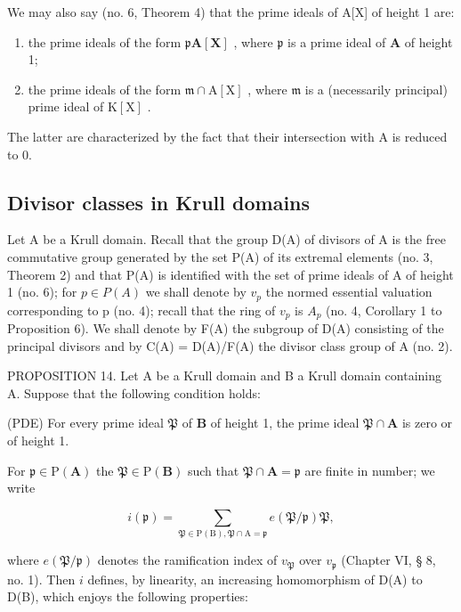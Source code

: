 We may also say (no. 6, Theorem 4) that the prime ideals of A{[}X{]} of height 1 are:

\begin{enumerate}
\def\labelenumi{(\arabic{enumi})}
\item
  the prime ideals of the form \(\mathfrak{p}\mathbf{A}[\mathbf{X}]\) , where \(\mathfrak{p}\) is a prime ideal of \(\mathbf{A}\) of height 1;
\item
  the prime ideals of the form \(\mathfrak{m} \cap \mathrm{A}[\mathrm{X}]\) , where \(\mathfrak{m}\) is a (necessarily principal) prime ideal of \(\mathrm{K}[\mathrm{X}]\) .
\end{enumerate}

The latter are characterized by the fact that their intersection with A is reduced to 0.

\subsection{Divisor classes in Krull domains}

Let A be a Krull domain. Recall that the group D(A) of divisors of A is the free commutative group generated by the set P(A) of its extremal elements (no. 3, Theorem 2) and that P(A) is identified with the set of prime ideals of A of height 1 (no. 6); for \(p \in P(A)\) we shall denote by \(v_{p}\) the normed essential valuation corresponding to p (no. 4); recall that the ring of \(v_{p}\) is \(A_{p}\) (no. 4, Corollary 1 to Proposition 6). We shall denote by F(A) the subgroup of D(A) consisting of the principal divisors and by C(A) = D(A)/F(A) the divisor class group of A (no. 2).

PROPOSITION 14. Let A be a Krull domain and B a Krull domain containing A. Suppose that the following condition holds:

(PDE) For every prime ideal \(\mathfrak{P}\) of \(\mathbf{B}\) of height 1, the prime ideal \(\mathfrak{P} \cap \mathbf{A}\) is zero or of height 1.

For \(\mathfrak{p} \in \mathrm{P}(\mathbf{A})\) the \(\mathfrak{P} \in \mathrm{P}(\mathbf{B})\) such that \(\mathfrak{P} \cap \mathbf{A} = \mathfrak{p}\) are finite in number; we write

\[
i (\mathfrak {p}) = \sum_ {\mathfrak {P} \in \mathrm{P} (\mathrm{B}), \mathfrak {P} \cap \mathrm{A} = \mathfrak {p}} e (\mathfrak {P} / \mathfrak {p}) \mathfrak {P},
\]

where \(e(\mathfrak{P} / \mathfrak{p})\) denotes the ramification index of \(v_{\mathfrak{P}}\) over \(v_{\mathfrak{p}}\) (Chapter VI, § 8, no. 1). Then \(i\) defines, by linearity, an increasing homomorphism of D(A) to D(B), which enjoys the following properties:

